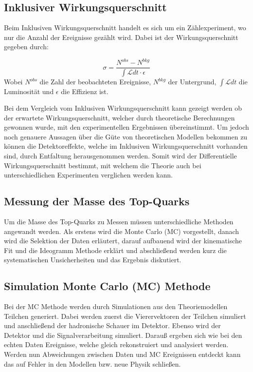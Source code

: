 \documentclass[a4paper]{article}
\begin{document}
\subsection{Inklusiver Wirkungsquerschnitt}
Beim Inklusiven Wirkungsquerschnitt handelt es sich um ein Zählexperiment, wo nur die Anzahl der Ereignisse gezählt wird. Dabei ist der Wirkungsquerschnitt gegeben durch:

\begin{equation}
\sigma = \frac{N^{obs} - N^{bkg}}{\int \mathcal{L} dt \cdot \epsilon}
\end{equation}
Wobei $N^{obs}$ die Zahl der beobachteten Ereignisse, $N^{bkg}$ der Untergrund, $\int \mathcal{L} dt$ die Luminosität und $\epsilon$ die Effizienz ist.

Bei dem Vergleich vom Inklusiven Wirkungsquerschnitt kann gezeigt werden ob der erwartete Wirkungsquerschnitt, welcher durch theoretische Berechnungen gewonnen wurde, mit den experimentellen Ergebnissen übereinstimmt. Um jedoch noch genauere Aussagen über die Güte von theoretischen Modellen bekommen zu können die Detektoreffekte, welche im Inklusiven Wirkungsquerschnitt vorhanden sind, durch Entfaltung herausgenommen werden. Somit wird der Differentielle Wirkungsquerschnitt bestimmt, mit welchem die Theorie auch bei unterschiedlichen Experimenten verglichen werden kann.

\subsection{Messung der Masse des Top-Quarks}
Um die Masse des Top-Quarks zu Messen müssen unterschiedliche Methoden angewandt werden. Als erstens wird die Monte Carlo (MC) vorgestellt, danach wird die Selektion der Daten erläutert, darauf aufbauend wird der kinematische Fit und die Ideogramm Methode erklärt und abschließend werden kurz die systematischen Unsicherheiten und das Ergebnis diskutiert.

\subsection{Simulation Monte Carlo (MC) Methode}
Bei der MC Methode werden durch Simulationen aus den Theoriemodellen Teilchen generiert. Dabei werden zuerst die Vierervektoren der Teilchen simuliert und anschließend der hadronische Schauer im Detektor. Ebenso wird der Detektor und die Signalverarbeitung simuliert. Darauß ergeben sich wie bei den echten Daten Ereignisse, welche gleich rekonstruiert und analysiert werden. Werden nun Abweichungen zwischen Daten und MC Ereignissen entdeckt kann das auf Fehler in den Modellen bzw. neue Physik schließen.
\end{document}

